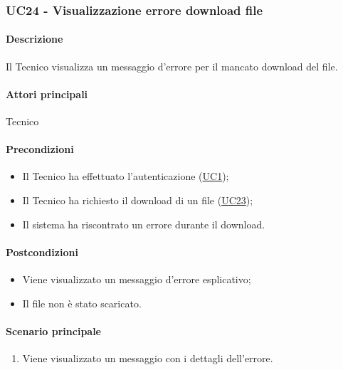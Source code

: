 \subsubsection{UC24 - Visualizzazione errore download file}\label{UC24}
\paragraph*{Descrizione}
Il Tecnico visualizza un messaggio d'errore per il mancato download del file.

\paragraph*{Attori principali}
Tecnico

\paragraph*{Precondizioni}
\begin{itemize}
  \item Il Tecnico ha effettuato l'autenticazione (\hyperref[UC1]{UC1});
  \item Il Tecnico ha richiesto il download di un file (\hyperref[UC23]{UC23});
  \item Il sistema ha riscontrato un errore durante il download.
\end{itemize}

\paragraph*{Postcondizioni}
\begin{itemize}
  \item Viene visualizzato un messaggio d'errore esplicativo;
  \item Il file non è stato scaricato.
\end{itemize}

\paragraph*{Scenario principale}
\begin{enumerate}
  \item Viene visualizzato un messaggio con i dettagli dell'errore.
\end{enumerate}